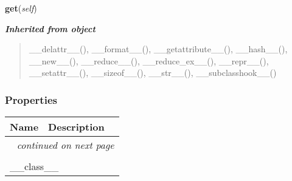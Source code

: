     \vspace{0.5ex}

\hspace{.8\funcindent}\begin{boxedminipage}{\funcwidth}

    \raggedright \textbf{get}(\textit{self})

\setlength{\parskip}{2ex}
\setlength{\parskip}{1ex}
    \end{boxedminipage}


\large{\textbf{\textit{Inherited from object}}}

\begin{quote}
\_\_delattr\_\_(), \_\_format\_\_(), \_\_getattribute\_\_(), \_\_hash\_\_(), \_\_new\_\_(), \_\_reduce\_\_(), \_\_reduce\_ex\_\_(), \_\_repr\_\_(), \_\_setattr\_\_(), \_\_sizeof\_\_(), \_\_str\_\_(), \_\_subclasshook\_\_()
\end{quote}


  \subsubsection{Properties}

    \vspace{-1cm}
\hspace{\varindent}\begin{longtable}{|p{\varnamewidth}|p{\vardescrwidth}|l}
\cline{1-2}
\cline{1-2} \centering \textbf{Name} & \centering \textbf{Description}& \\
\cline{1-2}
\endhead\cline{1-2}\multicolumn{3}{r}{\small\textit{continued on next page}}\\\endfoot\cline{1-2}
\endlastfoot\multicolumn{2}{|l|}{\textit{Inherited from object}}\\
\multicolumn{2}{|p{\varwidth}|}{\raggedright \_\_class\_\_}\\
\cline{1-2}
\end{longtable}



